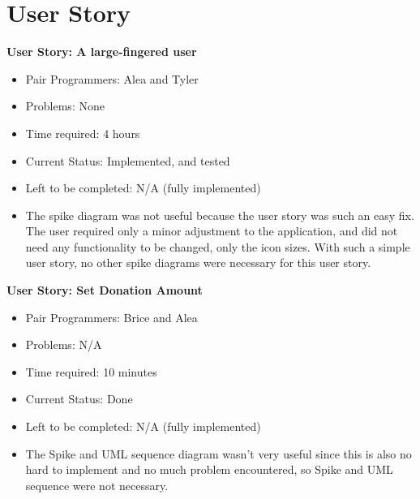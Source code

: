 \documentclass[a4paper]{article}
\begin{document}
\section{User Story}
\textbf{User Story: A large-fingered user}
\begin{itemize}
\item Pair Programmers: Alea and Tyler
\item Problems: None
\item Time required: 4 hours
\item Current Status: Implemented, and tested
\item Left to be completed: N/A (fully implemented)
\item The spike diagram was not useful because the user story was such an easy fix.  The user required only a minor adjustment to the application, and did not need any functionality to be changed, only the icon sizes.  With such a simple user story, no other spike diagrams were necessary for this user story.
\end{itemize}
\pagebreak
\textbf{User Story: Set Donation Amount}
\begin{itemize}
\item Pair Programmers: Brice and Alea
\item Problems: N/A
\item Time required: 10 minutes
\item Current Status: Done
\item Left to be completed: N/A (fully implemented)
\item The Spike and UML sequence diagram wasn’t very useful since this is also no hard to implement and no much problem encountered, so Spike and UML sequence were not necessary.
\end{itemize}
\end{document}
